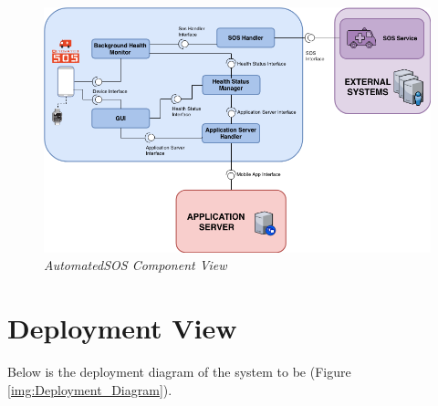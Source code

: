 \begin{figure}[H]
  \begin{center}
  	\includegraphics[width=\textwidth]{./img/Automated_Component.png}
    \hspace{0.05\linewidth}
    \centering
    \caption{\textit{AutomatedSOS Component View}}
		\label{img:AutomatedComponent}
    \end{center}
\end{figure}

\section{Deployment View}
Below is the deployment diagram of the system to be (Figure \ref{img:Deployment_Diagram}).

